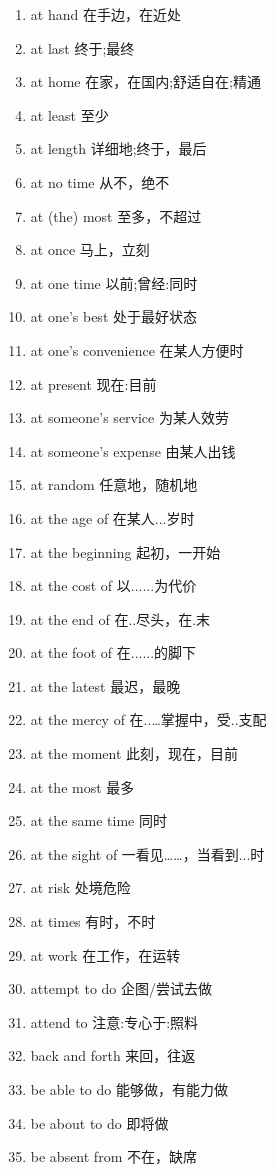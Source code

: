 \documentclass[a4paper,11pt,twocolumn]{ctexart}
\begin{document}
\begin{enumerate}[label=\arabic*., itemsep=0pt, parsep=2pt, topsep=5pt]
    \item at hand 在手边，在近处
    \item at last 终于;最终
    \item at home 在家，在国内;舒适自在;精通
    \item at least 至少
    \item at length 详细地;终于，最后
    \item at no time 从不，绝不
    \item at (the) most 至多，不超过
    \item at once 马上，立刻
    \item at one time 以前;曾经:同时
    \item at one's best 处于最好状态
    \item at one's convenience 在某人方便时
    \item at present 现在:目前
    \item at someone's service 为某人效劳
    \item at someone's expense 由某人出钱
    \item at random 任意地，随机地
    \item at the age of 在某人...岁时
    \item at the beginning 起初，一开始
    \item at the cost of 以......为代价
    \item at the end of 在..尽头，在.末
    \item at the foot of 在......的脚下
    \item at the latest 最迟，最晚
    \item at the mercy of 在..…掌握中，受..支配
    \item at the moment 此刻，现在，目前
    \item at the most 最多
    \item at the same time 同时
    \item at the sight of 一看见……，当看到...时
    \item at risk 处境危险
    \item at times 有时，不时
    \item at work 在工作，在运转
    \item attempt to do 企图/尝试去做
    \item attend to 注意:专心于:照料
    \item back and forth 来回，往返
    \item be able to do 能够做，有能力做
    \item be about to do 即将做
    \item be absent from 不在，缺席

\end{enumerate}
\end{document}
